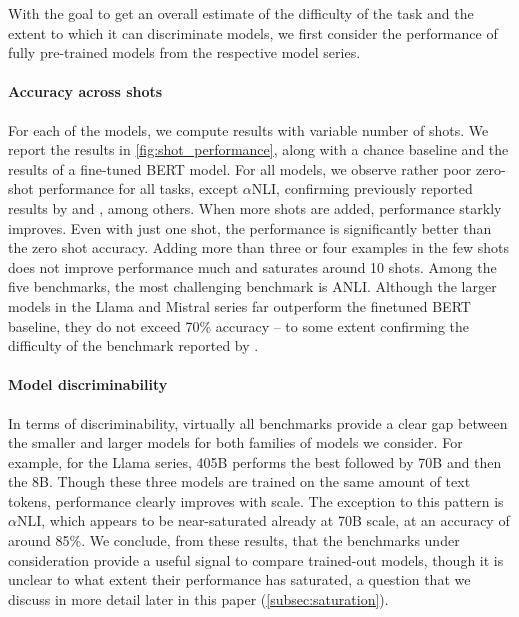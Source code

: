 With the goal to get an overall estimate of the difficulty of the task and the extent to which it can discriminate models, we first consider the performance of fully pre-trained models from the respective model series.

\paragraph{Accuracy across shots}
For each of the models, we compute results with variable number of shots.
We report the results in \cref{fig:shot_performance}, along with a chance baseline and the results of a fine-tuned BERT model.
For all models, we observe rather poor zero-shot performance for all tasks, except $\alpha$NLI, confirming previously reported results by \citet{ohmer2024form} and \citet{weber-etal-2023-mind}, among others.
When more shots are added, performance starkly improves.
Even with just one shot, the performance is significantly better than the zero shot accuracy.
Adding more than three or four examples in the few shots does not improve performance much and saturates around 10 shots. 
Among the five benchmarks, the most challenging benchmark is ANLI.
Although the larger models in the Llama and Mistral series far outperform the finetuned BERT baseline, they do not exceed 70\% accuracy -- to some extent confirming the difficulty of the benchmark reported by \citet{brown2020language}.

\paragraph{Model discriminability}
In terms of discriminability, virtually all benchmarks provide a clear gap between the smaller and larger models for both families of models we consider.
For example, for the Llama series, 405B performs the best followed by 70B and then the 8B.
Though these three models are trained on the same amount of text tokens, performance clearly improves with scale.
The exception to this pattern is $\alpha$NLI, which appears to be near-saturated already at 70B scale, at an accuracy of around 85\%.
We conclude, from these results, that the benchmarks under consideration provide a useful signal to compare trained-out models, though it is unclear to what extent their performance has saturated, a question that we discuss in more detail later in this paper (\cref{subsec:saturation}).

